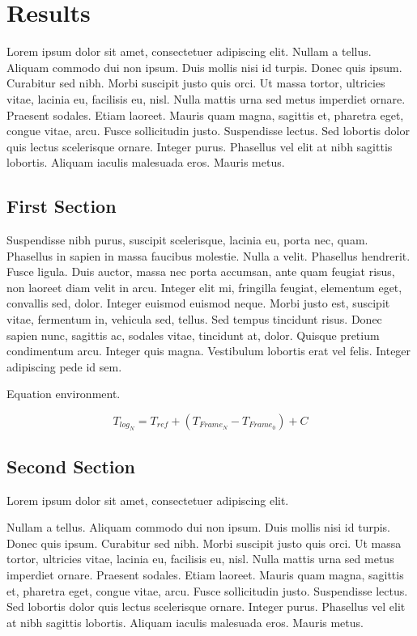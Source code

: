 \chapter{Results}
\label{c:chapter2} Lorem ipsum dolor sit amet, consectetuer adipiscing elit.
Nullam a tellus. Aliquam commodo dui non ipsum. Duis mollis nisi id turpis.
Donec quis ipsum. Curabitur sed nibh. Morbi suscipit justo quis orci. Ut massa
tortor, ultricies vitae, lacinia eu, facilisis eu, nisl. Nulla mattis urna sed
metus imperdiet ornare. Praesent sodales. Etiam laoreet. Mauris quam magna,
sagittis et, pharetra eget, congue vitae, arcu. Fusce sollicitudin justo.
Suspendisse lectus. Sed lobortis dolor quis lectus scelerisque ornare. Integer
purus. Phasellus vel elit at nibh sagittis lobortis. Aliquam iaculis malesuada
eros. Mauris metus.

\section{First Section}
\label{st:problemstatement} Suspendisse nibh purus, suscipit scelerisque,
lacinia eu, porta nec, quam. Phasellus in sapien in massa faucibus molestie.
Nulla a velit. Phasellus hendrerit. Fusce ligula. Duis auctor, massa nec porta
accumsan, ante quam feugiat risus, non laoreet diam velit in arcu. Integer elit
mi, fringilla feugiat, elementum eget, convallis sed, dolor. Integer euismod
euismod neque. Morbi justo est, suscipit vitae, fermentum in, vehicula sed,
tellus. Sed tempus tincidunt risus. Donec sapien nunc, sagittis ac, sodales
vitae, tincidunt at, dolor. Quisque pretium condimentum arcu. Integer quis
magna. Vestibulum lobortis erat vel felis. Integer adipiscing pede id sem.

Equation environment.

\begin{equation}
\mbox{$T_{log_{N}}$} =
\mbox{$T_{ref}$} + (\mbox{$T_{Frame_{N}}$} - \mbox{$T_{Frame_{0}}$})
+ \mbox{$C$}
\label{eq:log}
\end{equation}

\section{Second Section}
\label{st:discussion} 
Lorem ipsum dolor sit amet, consectetuer adipiscing elit.

Nullam a tellus. Aliquam commodo dui non ipsum. Duis mollis nisi id turpis.
Donec quis ipsum. Curabitur sed nibh. Morbi suscipit justo quis orci. Ut massa
tortor, ultricies vitae, lacinia eu, facilisis eu, nisl. Nulla mattis urna sed
metus imperdiet ornare. Praesent sodales. Etiam laoreet. Mauris quam magna,
sagittis et, pharetra eget, congue vitae, arcu. Fusce sollicitudin justo.
Suspendisse lectus. Sed lobortis dolor quis lectus scelerisque ornare. Integer
purus. Phasellus vel elit at nibh sagittis lobortis. Aliquam iaculis malesuada
eros. Mauris metus.

